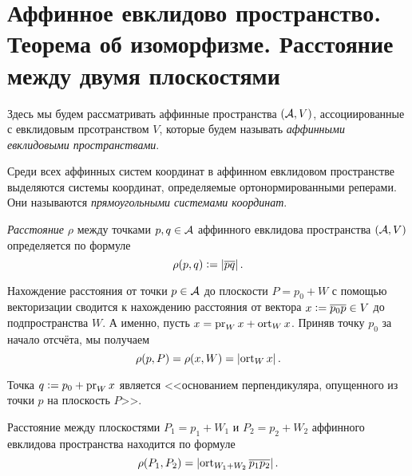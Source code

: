 \section{Аффинное евклидово пространство. Теорема об изоморфизме. Расстояние между двумя
плоскостями}

Здесь мы будем рассматривать аффинные пространства $(\mathcal{A}, V)$, ассоциированные с евклидовым прсотранством $V$, которые будем называть \textit{аффинными евклидовыми пространствами}.

Среди всех аффинных систем координат в аффинном евклидовом пространстве выделяются системы координат, определяемые ортонормированными реперами. Они называются \textit{прямоугольными системами координат}.

\begin{definition}
    \textit{Расстояние} $\rho$ между точками $p, q \in \mathcal{A}$ аффинного евклидова пространства $(\mathcal{A}, V)$ определяется по формуле
    \[
        \rho(p, q) \vcentcolon = \left\lvert\overline{pq}\right\rvert.
    \]
\end{definition}

Нахождение расстояния от точки $p \in \mathcal{A}$ до плоскости $P = p_0 + W$ с помощью векторизации сводится к нахождению расстояния от вектора $x \vcentcolon = \overline{p_0p} \in V$ до подпространства $W$. А именно, пусть $x = \operatorname{pr}_Wx + \operatorname{ort}_Wx$. Приняв точку $p_0$ за начало отсчёта, мы получаем
\[
    \rho(p, P) = \rho(x, W) = \left\lvert\operatorname{ort}_Wx\right\rvert.
\]

Точка $q \vcentcolon = p_0 + \operatorname{pr}_Wx$ является <<основанием перпендикуляра, опущенного из точки $p$ на плоскость $P$>>.

\begin{theorem}
    Расстояние между плоскостями $P_1 = p_1 + W_1$ и $P_2 = p_2 + W_2$ аффинного евклидова пространства находится по формуле
    \[
        \rho(P_1, P_2) = \left\lvert\operatorname{ort}_{W_1 + W_2}\overline{p_1p_2}\right\rvert.
    \]
\end{theorem}

